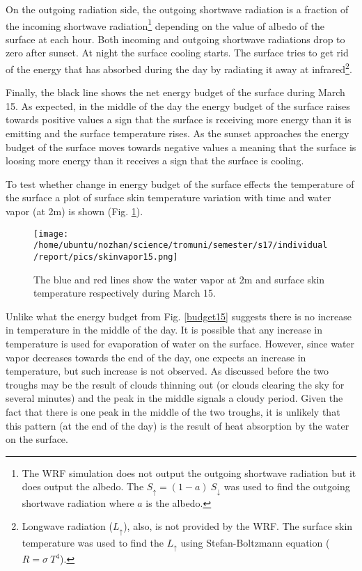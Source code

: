 \documentclass[a4paper,12pt]{article}
\numberwithin{equation}{section} %
\begin{document}
On the outgoing radiation side, the outgoing shortwave radiation is a fraction of the incoming shortwave radiation\footnote{The WRF simulation does not output the outgoing shortwave radiation but it does output the albedo. The $S_{\uparrow} = (1 - a)\: S_{\downarrow}$ was used to find the outgoing shortwave radiation where $a$ is the albedo.} depending on the value of albedo of the surface at each hour. Both incoming and outgoing shortwave radiations drop to zero after sunset. At night the surface cooling starts. The surface tries to get rid of the energy that has absorbed during the day by radiating it away at infrared\footnote{Longwave radiation ($L_{\uparrow}$), also, is not provided by the WRF. The surface skin temperature was used to find the $L_{\uparrow}$ using Stefan-Boltzmann equation ($R = \sigma \: T^4$).}. 

Finally, the black line shows the net energy budget of the surface during March 15. As expected, in the middle of the day the energy budget of the surface raises towards positive values a sign that the surface is receiving more energy than it is emitting and the surface temperature rises. As the sunset approaches the energy budget of the surface moves towards negative values a meaning that the surface is loosing more energy than it receives a sign that the surface is cooling.

To test whether change in energy budget of the surface effects the temperature of the surface a plot of surface skin temperature variation with time and water vapor (at 2m) is shown (Fig. \ref{skinvapor15}). 

\vspace{1cm}

\begin{figure}[bhp]
\texttt{[image: /home/ubuntu/nozhan/science/tromuni/semester/s17/individual/report/pics/skinvapor15.png]}
\caption{The blue and red lines show the water vapor at 2m and surface skin temperature respectively during March 15.}
\label{skinvapor15}
\end{figure}

\vspace{1cm}

Unlike what the energy budget from Fig. \ref{budget15} suggests there is no increase in temperature in the middle of the day. It is possible that any increase in temperature is used for evaporation of water on the surface. However, since water vapor decreases towards the end of the day, one expects an increase in temperature, but such increase is not observed. As discussed before the two troughs may be the result of clouds thinning out (or clouds clearing the sky for several minutes) and the peak in the middle signals a cloudy period. Given the fact that there is one peak in the middle of the two troughs, it is unlikely that this pattern (at the end of the day) is the result of heat absorption by the water on the surface.
\end{document}
